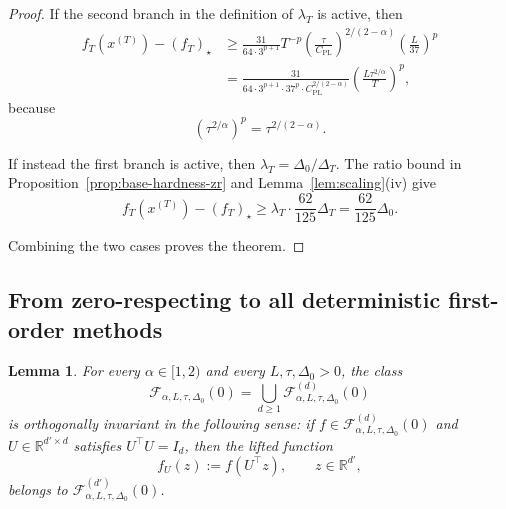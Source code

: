 \documentclass[11pt]{article}
\newtheorem{lemma}[theorem]{Lemma}
\newcommand{\R}{\mathbb{R}}
\begin{document}
\begin{proof}
If the second branch in the definition of $\lambda_T$ is active, then
\[
\begin{aligned}
f_T(x^{(T)})-(f_T)_\star
&\ge
\frac{31}{64\cdot 3^{p+1}}T^{-p}
\left(\frac{\tau}{C_{\mathrm{PL}}}\right)^{2/(2-\alpha)}
\left(\frac{L}{37}\right)^p\\
&=
\frac{31}{64\cdot 3^{p+1}\cdot 37^p\cdot C_{\mathrm{PL}}^{2/(2-\alpha)}}
\left(\frac{L\tau^{2/\alpha}}{T}\right)^p,
\end{aligned}
\]
because
\[
\left(\tau^{2/\alpha}\right)^p=\tau^{2/(2-\alpha)}.
\]

If instead the first branch is active, then \(\lambda_T=\Delta_0/\Delta_T\). The ratio bound in
Proposition~\ref{prop:base-hardness-zr} and Lemma~\ref{lem:scaling}(iv) give
	\[
	f_T(x^{(T)})-(f_T)_\star
	\ge
	\lambda_T\cdot \frac{62}{125}\Delta_T
	=
	\frac{62}{125}\Delta_0.
	\]

Combining the two cases proves the theorem.
\end{proof}

\subsection{From zero-respecting to all deterministic first-order methods}
\label{app:det-zr-to-all}

\begin{lemma}
\label{lem:orth-inv}
For every $\alpha\in[1,2)$ and every $L,\tau,\Delta_0>0$, the class
\[
\mathcal F_{\alpha,L,\tau,\Delta_0}(0)
=
\bigcup_{d\ge 1}\mathcal F^{(d)}_{\alpha,L,\tau,\Delta_0}(0)
\]
is orthogonally invariant in the following sense:
if $f\in\mathcal F^{(d)}_{\alpha,L,\tau,\Delta_0}(0)$ and $U\in\R^{d'\times d}$ satisfies $U^\top U=I_d$, then the lifted function
\[
f_U(z):=f(U^\top z),
\qquad z\in\R^{d'},
\]
belongs to $\mathcal F^{(d')}_{\alpha,L,\tau,\Delta_0}(0)$.
\end{lemma}
\end{document}
